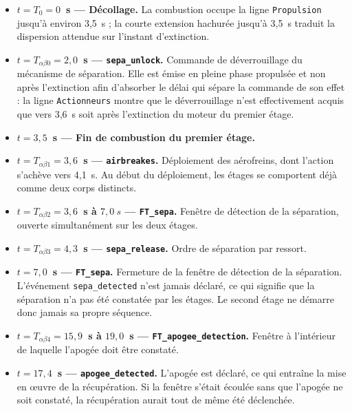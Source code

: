 \begin{itemize}
    \item \textbf{$t = T_0 = 0$~s — Décollage.} La combustion occupe la ligne \texttt{Propulsion} jusqu'à environ 3,5~s ; la
    courte extension hachurée jusqu'à 3,5~s traduit la dispersion attendue sur l'instant d'extinction.\\

    \item \textbf{$t = T_{\alpha\beta0} = 2{,}0$~s — \texttt{sepa\_unlock}.} Commande de déverrouillage du mécanisme de
    séparation. Elle est émise en pleine phase propulsée et non après l'extinction afin d'absorber le délai qui sépare la
    commande de son effet : la ligne \texttt{Actionneurs} montre que le déverrouillage n'est effectivement acquis que vers 3,6~s
    soit après l'extinction du moteur du premier étage.\\

    \item \textbf{$t = 3{,}5$~s — Fin de combustion du premier étage.}\\

    \item \textbf{$t = T_{\alpha\beta1} = 3{,}6$~s — \texttt{airbreakes}.} Déploiement des aérofreins, dont l'action s'achève
    vers 4,1~s. Au début du déploiement, les étages se comportent déjà comme deux corps distincts.\\  

    \item \textbf{$t = T_{\alpha\beta2} = 3{,}6$~s à $7,0~s$ — \texttt{FT\_sepa}.} Fenêtre de détection de la séparation, ouverte
    simultanément sur les deux étages.\\

    \item \textbf{$t = T_{\alpha\beta3} = 4{,}3$~s — \texttt{sepa\_release}.} Ordre de séparation par ressort.\\

    \item \textbf{$t = 7{,}0$~s — \texttt{FT\_sepa}.} Fermeture de la fenêtre de détection de la séparation. L'événement
    \texttt{sepa\_detected} n'est jamais déclaré, ce qui signifie que la séparation n'a pas été constatée par les étages. Le
    second étage ne démarre donc jamais sa propre séquence.\\

    \item \textbf{$t = T_{\alpha\beta4} = 15{,}9$~s à $19,0$~s — \texttt{FT\_apogee\_detection}.} Fenêtre à l'intérieur de
    laquelle l'apogée doit être constaté.\\

    \item \textbf{$t = 17{,}4$~s — \texttt{apogee\_detected}.} L'apogée est déclaré, ce qui entraîne la mise en \oe uvre de
    la récupération. Si la fenêtre s'était écoulée sans que l'apogée ne soit constaté, la récupération aurait tout de même été
    déclenchée.
\end{itemize}

